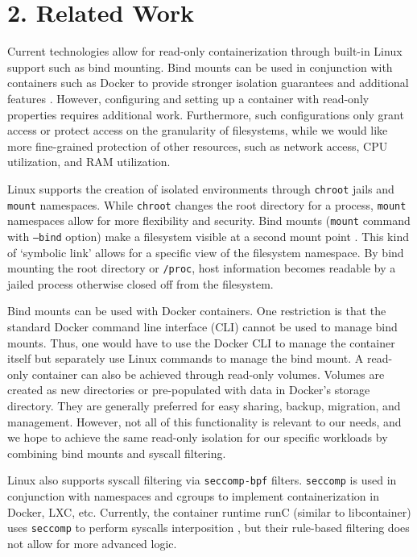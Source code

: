 \documentclass{proc}
\begin{document}
\section*{2. Related Work}

Current technologies allow for read-only containerization through built-in Linux support such as bind mounting. Bind mounts can be used in conjunction with containers such as Docker to provide stronger isolation guarantees and additional features \cite{dockerdoc}. However, configuring and setting up a container with read-only properties requires additional work. Furthermore, such configurations only grant access or protect access on the granularity of filesystems, while we would like more fine-grained protection of other resources, such as network access, CPU utilization, and RAM utilization.

Linux supports the creation of isolated environments through \texttt{chroot} jails and \texttt{mount} namespaces. While \texttt{chroot} changes the root directory for a process, \texttt{mount} namespaces allow for more flexibility and security. Bind mounts (\texttt{mount} command with \texttt{--bind} option) make a filesystem visible at a second mount point \cite{bindmount}. This kind of `symbolic link' allows for a specific view of the filesystem namespace. By bind mounting the root directory or \texttt{/proc}, host information becomes readable by a jailed process otherwise closed off from the filesystem.

Bind mounts can be used with Docker containers. One restriction is that the standard Docker command line interface (CLI) cannot be used to manage bind mounts. Thus, one would have to use the Docker CLI to manage the container itself but separately use Linux commands to manage the bind mount. A read-only container can also be achieved through read-only volumes. Volumes are created as new directories or pre-populated with data in Docker's storage directory. They are generally preferred for easy sharing, backup, migration, and management. However, not all of this functionality is relevant to our needs, and we hope to achieve the same read-only isolation for our specific workloads by combining bind mounts and syscall filtering.

Linux also supports syscall filtering via \texttt{seccomp-bpf} filters. \texttt{seccomp} is used in conjunction with namespaces and cgroups to implement containerization in Docker, LXC, etc. Currently, the container runtime runC (similar to libcontainer) uses \texttt{seccomp} to perform syscalls interposition \cite{opencontainerinitiative}, but their rule-based filtering does not allow for more advanced logic.
\end{document}
